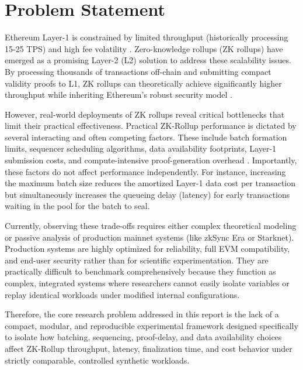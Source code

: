 \section{Problem Statement}
\label{sec:problem_statement}

Ethereum Layer-1 is constrained by limited throughput (historically processing 15-25 TPS) and high fee volatility \citep{buterin2014ethereum}. Zero-knowledge rollups (ZK rollups) have emerged as a promising Layer-2 (L2) solution to address these scalability issues. By processing thousands of transactions off-chain and submitting compact validity proofs to L1, ZK rollups can theoretically achieve significantly higher throughput while inheriting Ethereum’s robust security model \citep{tran2023implementation}. 

However, real-world deployments of ZK rollups reveal critical bottlenecks that limit their practical effectiveness. Practical ZK-Rollup performance is dictated by several interacting and often competing factors. These include batch formation limits, sequencer scheduling algorithms, data availability footprints, Layer-1 submission costs, and compute-intensive proof-generation overhead \citep{habib2025bottlenecks,chaliasos2024analyzing}. Importantly, these factors do not affect performance independently. For instance, increasing the maximum batch size reduces the amortized Layer-1 data cost per transaction but simultaneously increases the queueing delay (latency) for early transactions waiting in the pool for the batch to seal.

Currently, observing these trade-offs requires either complex theoretical modeling or passive analysis of production mainnet systems (like zkSync Era or Starknet). Production systems are highly optimized for reliability, full EVM compatibility, and end-user security rather than for scientific experimentation. They are practically difficult to benchmark comprehensively because they function as complex, integrated systems where researchers cannot easily isolate variables or replay identical workloads under modified internal configurations.

Therefore, the core research problem addressed in this report is the lack of a compact, modular, and reproducible experimental framework designed specifically to isolate how batching, sequencing, proof-delay, and data availability choices affect ZK-Rollup throughput, latency, finalization time, and cost behavior under strictly comparable, controlled synthetic workloads.
